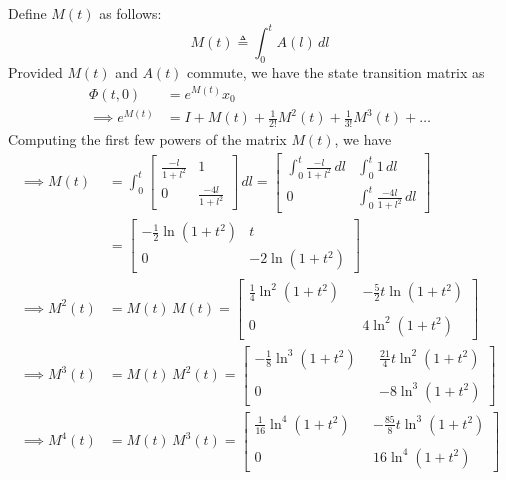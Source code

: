 Define \( M(t) \) as follows:
\begin{equation}
    M(t)
    \triangleq
    \int_{0}^{t} A(l) \, dl
\end{equation}
Provided \( M(t) \) and \( A(t) \) commute, we have the state transition matrix as
\begin{align*}
    \Phi(t, 0)
     & =
    e^{M(t)} x_0
    \\
    \implies
    e^{M(t)}
     & =
    I + M(t) + \frac{1}{2!} M^2(t) + \frac{1}{3!} M^3(t) + \ldots
\end{align*}
Computing the first few powers of the matrix \( M(t) \), we have
\begin{align*}
    \implies
    M(t)
        & =
    \int_{0}^{t}
    \begin{bmatrix}
        \frac{-l}{1+l^2} & 1                 \\
        0                & \frac{-4l}{1+l^2}
    \end{bmatrix}
    \, dl
    =
    \begin{bmatrix}
        \int_{0}^{t} \frac{-l}{1+l^2} \, dl
        &
        \int_{0}^{t} 1 \, dl
        \\
        0
        &
        \int_{0}^{t} \frac{-4l}{1+l^2} \, dl
    \end{bmatrix}
    \\ & =
    \begin{bmatrix}
        -\frac{1}{2} \ln(1+t^2)
        &
        t
        \\
        0
        &
        -2 \ln(1+t^2)
    \end{bmatrix}
    \\
    \implies
    M^2(t)
    & =
    M(t) \, M(t)
    =
    \begin{bmatrix}
        \frac{1}{4} \ln^2(1+t^2)
        & &
        -\frac{5}{2} t \ln(1+t^2)
        \\ \\
        0
        & &
        4 \ln^2(1+t^2)
    \end{bmatrix}
    \\
    \implies
    M^3(t)
    & =
    M(t) \, M^2(t)
    =
    \begin{bmatrix}
        -\frac{1}{8} \ln^3(1+t^2)
        & &
        \frac{21}{4} t \ln^2(1+t^2)
        \\ \\
        0
        & &
        -8 \ln^3(1+t^2)
    \end{bmatrix}
    \\
    \implies
    M^4(t)
    & =
    M(t) \, M^3(t)
    =
    \begin{bmatrix}
        \frac{1}{16} \ln^4(1+t^2)
        & &
        -\frac{85}{8} t \ln^3(1+t^2)
        \\ \\
        0
        & &
        16 \ln^4(1+t^2)
    \end{bmatrix}
\end{align*}

